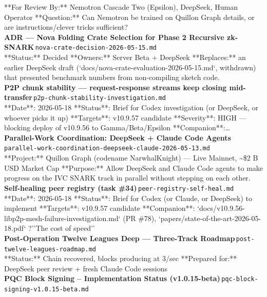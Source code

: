 \documentclass[11pt,a4paper]{article}
\begin{document}
**For Review By:** Nemotron Cascade Two (Epsilon), DeepSeek, Human Operator **Question:** Can Nemotron be trained on Quillon Graph details, or are instructions/clever tricks sufficient?\\[6pt]
\noindent\textbf{ADR --- Nova Folding Crate Selection for Phase 2 Recursive zk-SNARK}\,\textcolor{qgray}{\small \texttt{nova-crate-decision-2026-05-15.md}}\\
**Status:** Decided **Owners:** Server Beta + DeepSeek **Replaces:** an earlier DeepSeek draft (`docs/nova-crate-evaluation-2026-05-15.md`, withdrawn) that presented benchmark numbers from non-compiling sketch code.\\[6pt]
\noindent\textbf{P2P chunk stability --- request-response streams keep closing mid-transfer}\,\textcolor{qgray}{\small \texttt{p2p-chunk-stability-investigation.md}}\\
**Date**: 2026-05-18 **Status**: Brief for Codex investigation (or DeepSeek, or whoever picks it up) **Targets**: v10.9.57 candidate **Severity**: HIGH --- blocking deploy of v10.9.56 to Gamma/Beta/Epsilon **Companion**:\ldots{}\\[6pt]
\noindent\textbf{Parallel-Work Coordination: DeepSeek + Claude Code Agents}\,\textcolor{qgray}{\small \texttt{parallel-work-coordination-deepseek-claude-2026-05-13.md}}\\
**Project:** Quillon Graph (codename NarwhalKnight) --- Live Mainnet, \textasciitilde{}\$2 B USD Market Cap **Purpose:** Allow DeepSeek and Claude Code agents to make progress on the IVC SNARK track in parallel without stepping on each other.\\[6pt]
\noindent\textbf{Self-healing peer registry (task \#34)}\,\textcolor{qgray}{\small \texttt{peer-registry-self-heal.md}}\\
**Date**: 2026-05-18 **Status**: Brief for Codex (or Claude, or DeepSeek) to implement **Targets**: v10.9.57 candidate **Companion**: `docs/v10.9.56-libp2p-mesh-failure-investigation.md` (PR \#78), `papers/state-of-the-art-2026-05-18.pdf` ?''The cost of speed''\\[6pt]
\noindent\textbf{Post-Operation Twelve Leagues Deep --- Three-Track Roadmap}\,\textcolor{qgray}{\small \texttt{post-twelve-leagues-roadmap.md}}\\
**Status:** Chain recovered, blocks producing at 3/sec **Prepared for:** DeepSeek peer review + fresh Claude Code sessions\\[6pt]
\noindent\textbf{PQC Block Signing -- Implementation Status (v1.0.15-beta)}\,\textcolor{qgray}{\small \texttt{pqc-block-signing-v1.0.15-beta.md}}\\
\end{document}
